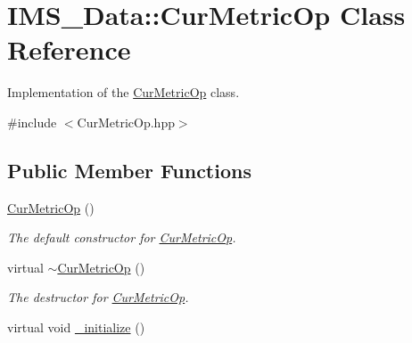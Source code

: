 \hypertarget{classIMS__Data_1_1CurMetricOp}{
\section{IMS\_\-Data::CurMetricOp Class Reference}
\label{classIMS__Data_1_1CurMetricOp}
}


Implementation of the \hyperlink{classIMS__Data_1_1CurMetricOp}{CurMetricOp} class.  




{\ttfamily \#include $<$CurMetricOp.hpp$>$}

\subsection*{Public Member Functions}
\begin{DoxyCompactItemize}
\item 
\hypertarget{classIMS__Data_1_1CurMetricOp_a70d979c78e1eea7084c1cce0cdeb17be}{
\hyperlink{classIMS__Data_1_1CurMetricOp_a70d979c78e1eea7084c1cce0cdeb17be}{CurMetricOp} ()}
\label{classIMS__Data_1_1CurMetricOp_a70d979c78e1eea7084c1cce0cdeb17be}

\begin{DoxyCompactList}\small\item\em The default constructor for \hyperlink{classIMS__Data_1_1CurMetricOp}{CurMetricOp}. \item\end{DoxyCompactList}\item 
\hypertarget{classIMS__Data_1_1CurMetricOp_a0a24d145e68011eb17179f1c82cf81d9}{
virtual \hyperlink{classIMS__Data_1_1CurMetricOp_a0a24d145e68011eb17179f1c82cf81d9}{$\sim$CurMetricOp} ()}
\label{classIMS__Data_1_1CurMetricOp_a0a24d145e68011eb17179f1c82cf81d9}

\begin{DoxyCompactList}\small\item\em The destructor for \hyperlink{classIMS__Data_1_1CurMetricOp}{CurMetricOp}. \item\end{DoxyCompactList}\item 
\hypertarget{classIMS__Data_1_1CurMetricOp_ae207bc7a045c56bbfbbe6bee27144d7c}{
virtual void \hyperlink{classIMS__Data_1_1CurMetricOp_ae207bc7a045c56bbfbbe6bee27144d7c}{\_\-initialize} ()}
\label{classIMS__Data_1_1CurMetricOp_ae207bc7a045c56bbfbbe6bee27144d7c}


\end{DoxyCompactItemize}
